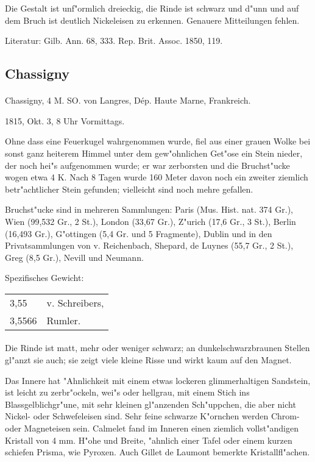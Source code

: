 \documentclass[a4paper, 11pt, oneside]{article}
\begin{document}
Die Gestalt ist unf"ormlich dreieckig, die Rinde ist schwarz und d"unn und auf dem Bruch ist deutlich Nickeleisen zu erkennen. Genauere Mitteilungen fehlen.

Literatur: Gilb. Ann. 68, 333. Rep. Brit. Assoc. 1850, 119.

\subsection{Chassigny}
\normalsize
\paragraph{}
Chassigny, 4 M. SO. von Langres, Dép. Haute Marne, Frankreich.

1815, Okt. 3, 8 Uhr Vormittags.

Ohne dass eine Feuerkugel wahrgenommen wurde, fiel aus einer grauen Wolke bei sonst ganz heiterem Himmel unter dem gew"ohnlichen Get"ose ein Stein nieder, der noch hei"s aufgenommen wurde; er war zerborsten und die Bruchst"ucke wogen etwa 4 K. Nach 8 Tagen wurde 160 Meter davon noch ein zweiter ziemlich betr"achtlicher Stein gefunden; vielleicht sind noch mehre gefallen.

Bruchst"ucke sind in mehreren Sammlungen: Paris (Mus. Hist. nat. 374 Gr.), Wien (99,532 Gr., 2 St.), London (33,67 Gr.), Z"urich (17,6 Gr., 3 St.), Berlin (16,493 Gr.), G"ottingen (5,4 Gr. und 5 Fragmente), Dublin und in den Privatsammlungen von v. Reichenbach, Shepard, de Luynes (55,7 Gr., 2 St.), Greg (8,5 Gr.), Nevill und Neumann.

Spezifisches Gewicht:
\begin{table}[!ht]
    \centering
    \begin{tabular}{l l}
        3,55 & v. Schreibers,\\
        3,5566 & Rumler.
    \end{tabular}
\end{table}
\paragraph{}
Die Rinde ist matt, mehr oder weniger schwarz; an dunkelschwarzbraunen Stellen gl"anzt sie auch; sie zeigt viele kleine Risse und wirkt kaum auf den Magnet.

Das Innere hat "Ahnlichkeit mit einem etwas lockeren glimmerhaltigen Sandstein, ist leicht zu zerbr"ockeln, wei"s oder hellgrau, mit einem Stich ins Blassgelblichgr"une, mit sehr kleinen gl"anzenden Sch"uppchen, die aber nicht Nickel- oder Schwefeleisen sind. Sehr feine schwarze K"ornchen werden Chrom- oder Magneteisen sein. Calmelet fand im Inneren einen ziemlich vollst"andigen Kristall von 4 mm. H"ohe und Breite, "ahnlich einer Tafel oder einem kurzen schiefen Prisma, wie Pyroxen. Auch Gillet de Laumont bemerkte Kristallfl"achen.
\end{document}
